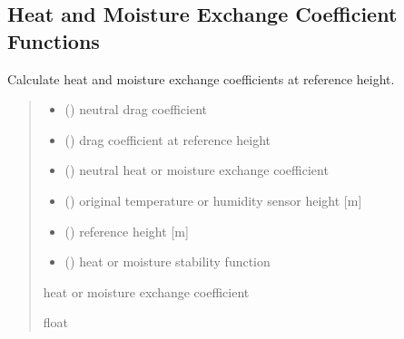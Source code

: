 \documentclass[letterpaper,10pt,english]{sphinxmanual}
\begin{document}
\subsection{Heat and Moisture Exchange Coefficient Functions}
\label{\detokenize{users_guide:heat-and-moisture-exchange-coefficient-functions}}

\begin{fulllineitems}

\pysigstartsignatures
{}
\pysigstopsignatures
\sphinxAtStartPar
Calculate heat and moisture exchange coefficients at reference height.
\begin{quote}\begin{description}
\begin{itemize}
\item {} 
\sphinxAtStartPar
{} () \textendash{} neutral drag coefficient

\item {} 
\sphinxAtStartPar
{} () \textendash{} drag coefficient at reference height

\item {} 
\sphinxAtStartPar
{} () \textendash{} neutral heat or moisture exchange coefficient

\item {} 
\sphinxAtStartPar
{} () \textendash{} original temperature or humidity sensor height {[}m{]}

\item {} 
\sphinxAtStartPar
{} () \textendash{} reference height                   {[}m{]}

\item {} 
\sphinxAtStartPar
{} () \textendash{} heat or moisture stability function

\end{itemize}

\sphinxAtStartPar
{} \textendash{} heat or moisture exchange coefficient

\sphinxAtStartPar
float

\end{description}\end{quote}

\end{fulllineitems}
\end{document}
